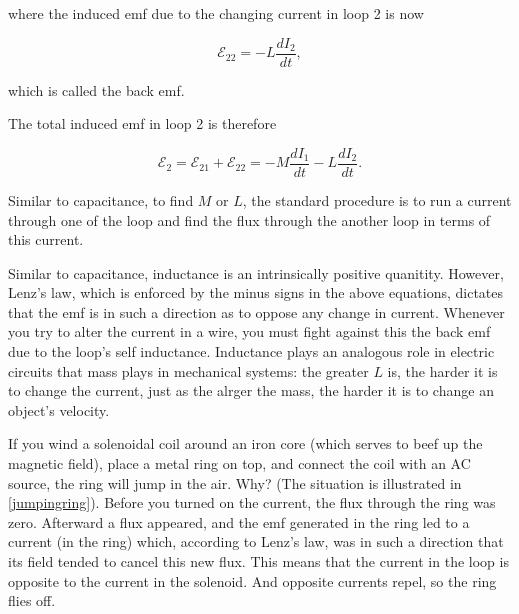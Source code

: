 \documentclass[english,a4paper,12pt]{report}
\begin{document}
where the induced emf due to the changing current in loop 2 is now

\begin{equation}
    \mathcal{E}_{22} = - L\frac{dI_2 }{dt},  
\end{equation}

which is called the back emf.

The total induced emf in loop 2 is therefore

\begin{equation}
    \mathcal{E}_{2}   = \mathcal{E} _{21} + \mathcal{E}_{22} =  -M\frac{dI_1 }{dt}  - L \frac{dI_2 }{dt}.
\end{equation}

Similar to capacitance, to find \(M \text { or } L\), the standard procedure is to run a current through one of the loop and find the flux through the another loop in terms of this current. 

Similar to capacitance, inductance is an intrinsically positive quanitity. However, Lenz's law, which is enforced by the minus signs in the above equations, dictates that the emf is in such a direction as to oppose any change in current. Whenever you try to alter the current in a wire, you must fight against this the back emf due to the loop's self inductance. Inductance plays an analogous role in electric circuits that mass plays in mechanical systems: the greater \(L\) is, the harder it is to change the current, just as the alrger the mass, the harder it is to change an object's velocity.

{If you wind a solenoidal coil around an iron core (which serves to beef up the magnetic field), place a metal ring on top, and connect the coil with an AC source, the ring will jump in the air. Why? (The situation is illustrated in \cref{jumpingring}).}
{Before you turned on the current, the flux through the ring was zero. Afterward a flux appeared, and the emf generated in the ring led to a current (in the ring) which, according to Lenz’s law, was in such a direction that its field tended to cancel this new flux. This means that the current in the loop is opposite to the current in the solenoid. And opposite currents repel, so the ring flies off.} 
\end{document}
